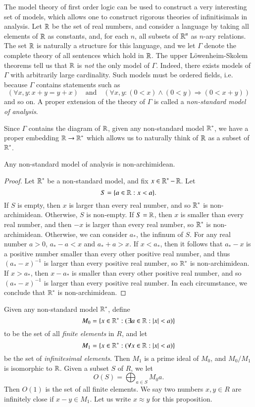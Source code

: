 The model theory of first order logic can be used to construct a very interesting set of models, which allows one to construct rigorous theories of infinitisimals in analysis. Let $\operatorname{\mathbb{R}}$ be the set of real numbers, and consider a language by taking all elements of $\operatorname{\mathbb{R}}$ as constants, and, for each $n$, all subsets of $\operatorname{\mathbb{R}}^n$ as $n$-ary relations. The set $\operatorname{\mathbb{R}}$ is naturally a structure for this language, and we let $\Gamma$ denote the complete theory of all sentences which hold in $\operatorname{\mathbb{R}}$. The upper L\"{o}wenheim-Skolem theorems tell us that $\operatorname{\mathbb{R}}$ is \emph{not} the only model of $\Gamma$. Indeed, there exists models of $\Gamma$ with arbitrarily large cardinality. Such models must be ordered fields, i.e. because $\Gamma$ contains statements such as
%
\[ (\forall x,y: x + y = y + x) \quad\text{and}\quad (\forall x,y: (0 < x) \wedge (0 < y) \Rightarrow (0 < x + y) ) \]
%
and so on. A proper extension of the theory of $\Gamma$ is called a \emph{non-standard model of analysis}.

Since $\Gamma$ contains the diagram of $\operatorname{\mathbb{R}}$, given any non-standard model $\operatorname{\mathbb{R}}^*$, we have a proper embedding $\operatorname{\mathbb{R}} \to \operatorname{\mathbb{R}}^*$ which allows us to naturally think of $\operatorname{\mathbb{R}}$ as a subset of $\operatorname{\mathbb{R}}^*$.

\begin{lemma}
    Any non-standard model of analysis is non-archimidean.
\end{lemma}
\begin{proof}
    Let $\operatorname{\mathbb{R}}^*$ be a non-standard model, and fix $x \in \operatorname{\mathbb{R}}^* - \operatorname{\mathbb{R}}$. Let
    \[ S = \{ a \in \operatorname{\mathbb{R}} : x < a \}. \]
    If $S$ is empty, then $x$ is larger than every real number, and so $\operatorname{\mathbb{R}}^*$ is non-archimidean. Otherwise, $S$ is non-empty. If $S = \operatorname{\mathbb{R}}$, then $x$ is smaller than every real number, and then $-x$ is larger than every real number, so $\operatorname{\mathbb{R}}^*$ is non-archimidean. Otherwise, we can consider $a_*$, the infinum of $S$. For any real number $a > 0$, $a_* - a < x$ and $a_* + a > x$. If $x < a_*$, then it follows that $a_* - x$ is a positive number smaller than every other positive real number, and thus $(a_* - x)^{-1}$ is larger than every positive real number, so $\operatorname{\mathbb{R}}^*$ is non-archimidean. If $x > a_*$, then $x - a_*$ is smaller than every other positive real number, and so $(a_* - x)^{-1}$ is larger than every positive real number. In each circumstance, we conclude that $\operatorname{\mathbb{R}}^*$ is non-archimidean.
\end{proof}

Given any non-standard model $\operatorname{\mathbb{R}}^*$, define
%
\[ M_0 = \{ x \in \operatorname{\mathbb{R}}^*: (\exists a \in \operatorname{\mathbb{R}}: |x| < a) \} \]
%
to be the set of all \emph{finite elements} in $R$, and let
%
\[ M_1 = \{ x \in \operatorname{\mathbb{R}}^*: (\forall x \in \operatorname{\mathbb{R}}: |x| < a) \} \]
%
be the set of \emph{infinitesimal elements}. Then $M_1$ is a prime ideal of $M_0$, and $M_0 / M_1$ is isomorphic to $\operatorname{\mathbb{R}}$. Given a subset $S$ of $R$, we let
%
\[ O(S) = \bigoplus_{a \in S} M_0 a. \]
%
Then $O(1)$ is the set of all finite elements. We say two numbers $x,y \in R$ are infinitely close if $x - y \in M_1$. Let us write $x \approx y$ for this proposition.

